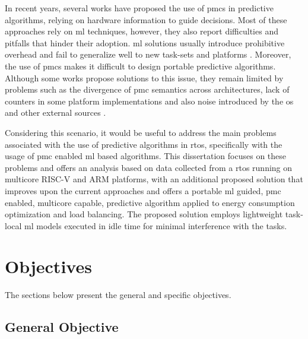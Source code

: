 
In recent years, several works have proposed the use of \glspl{pmc} in predictive algorithms, relying on hardware information to guide decisions. Most of these approaches rely on \gls{ml} techniques, however, they also report difficulties and pitfalls that hinder their adoption. \gls{ml} solutions usually introduce prohibitive overhead and fail to generalize well to new task-sets and platforms \cite{rahim2025survey}. Moreover, the use of \glspl{pmc} makes it difficult to design portable predictive algorithms. Although some works propose solutions to this issue, they remain limited by problems such as the divergence of \gls{pmc} semantics across architectures, lack of counters in some platform implementations and also noise introduced by the \gls{os} and other external sources \cite{das2019sok}.

Considering this scenario, it would be useful to address the main problems associated with the use of predictive algorithms in \gls{rtos}, specifically with the usage of \gls{pmc} enabled \gls{ml} based algorithms. This dissertation focuses on these problems and offers an analysis based on data collected from a \gls{rtos} running on multicore RISC-V and ARM platforms, with an additional proposed solution that improves upon the current approaches and offers a portable \gls{ml} guided, \gls{pmc} enabled, multicore capable, predictive algorithm applied to energy consumption optimization and load balancing. The proposed solution employs lightweight task-local \gls{ml} models executed in idle time for minimal interference with the tasks.


\section{Objectives}

The sections below present the general and specific objectives.

\subsection{General Objective}

